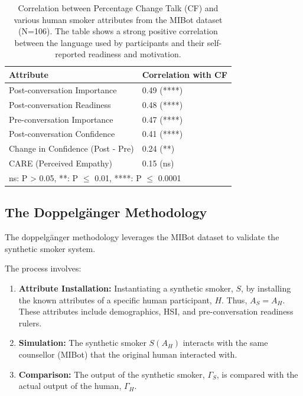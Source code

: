 \begin{table}[h!]
\centering
\caption[Correlation of Change Fraction with Human Smoker Attributes]{Correlation between Percentage Change Talk (CF) and various human smoker attributes from the MIBot dataset (N=106). The table shows a strong positive correlation between the language used by participants and their self-reported readiness and motivation.}
\label{tab:ct-correlation}
\begin{tabular}{@{}ll@{}}
\toprule
\textbf{Attribute} & \textbf{Correlation with CF} \\ \midrule
Post-conversation Importance & 0.49 (****) \\
Post-conversation Readiness & 0.48 (****) \\
Pre-conversation Importance & 0.47 (****) \\
Post-conversation Confidence & 0.41 (****) \\
Change in Confidence (Post - Pre) & 0.24 (**) \\
CARE (Perceived Empathy) & 0.15 (ns) \\
\bottomrule
\multicolumn{2}{l}{\footnotesize{ns: P > 0.05, **: P $\le$ 0.01, ****: P $\le$ 0.0001}}
\end{tabular}
\end{table}

\subsection{The Doppelgänger Methodology}

The doppelgänger methodology leverages the MIBot dataset to validate the synthetic smoker system.

The process involves:
\begin{enumerate}
    \item \textbf{Attribute Installation:} Instantiating a synthetic smoker, $S$, by installing the known attributes of a specific human participant, $H$. Thus, $A_S = A_H$. These attributes include demographics, HSI, and pre-conversation readiness rulers.
    \item \textbf{Simulation:} The synthetic smoker $S(A_H)$ interacts with the same counsellor (MIBot) that the original human interacted with.
    \item \textbf{Comparison:} The output of the synthetic smoker, $\Gamma_S$, is compared with the actual output of the human, $\Gamma_H$.
\end{enumerate}

